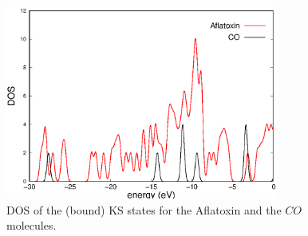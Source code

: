 \documentclass[11pt,a4paper]{article}
\begin{document}
\begin{figure}[h]
    \centering
    \includegraphics[width=9cm]{DOS_Afla&CO.eps} 
    \caption{DOS of the (bound) KS states for the Aflatoxin and the $CO$ molecules. }
\label{dos}
\end{figure}



\end{document}
